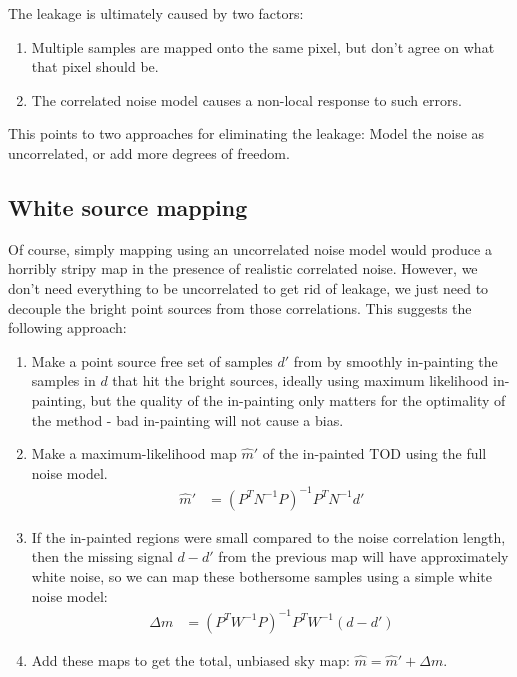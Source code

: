 \documentclass{article}
\begin{document}
The leakage is ultimately caused by two factors:
\begin{enumerate}
	\item Multiple samples are mapped onto the same pixel, but don't agree on what that
		pixel should be.
	\item The correlated noise model causes a non-local response to such errors.
\end{enumerate}
This points to two approaches for eliminating the leakage: Model the noise as
uncorrelated, or add more degrees of freedom.

\subsection{White source mapping}
Of course, simply mapping using an uncorrelated noise model would produce a horribly stripy
map in the presence of
realistic correlated noise. However, we don't need everything to be uncorrelated to get
rid of leakage, we just need to decouple the bright point sources from those correlations.
This suggests the following approach:
\begin{enumerate}
	\item Make a point source free set of samples $d'$ from by smoothly in-painting the samples in $d$
		that hit the bright sources, ideally using maximum likelihood in-painting, but the quality of the
		in-painting only matters for the optimality of the method - bad in-painting will not cause a bias.
	\item Make a maximum-likelihood map $\hat m'$ of the in-painted TOD using the full noise model.
		\begin{align}
		\hat m' &= (P^TN^{-1}P)^{-1}P^T N^{-1} d'
		\end{align}
	\item If the in-painted regions were small compared to the noise correlation length, then
		the missing signal $d-d'$ from the previous map will have approximately white noise,
		so we can map these bothersome samples using a simple white noise model:
		\begin{align}
		\Delta m &= (P^TW^{-1}P)^{-1}P^T W^{-1}(d-d')
		\end{align}
	\item Add these maps to get the total, unbiased sky map: $\hat m = \hat m' + \Delta m$.
\end{enumerate}
\end{document}
